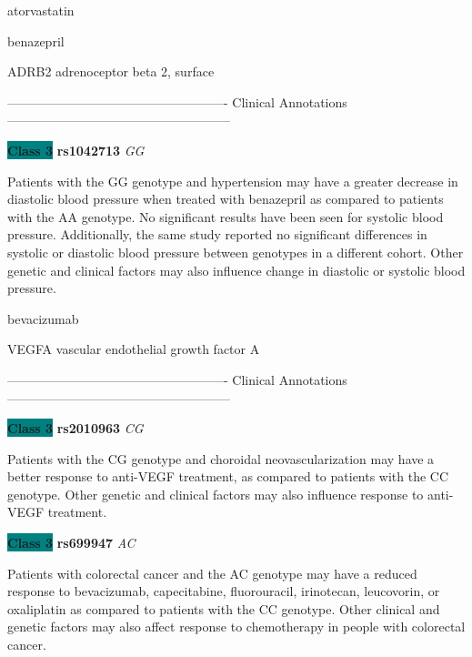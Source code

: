 \documentclass{resume} %
\begin{document}
\begin{rSection}{ atorvastatin }
\end{rSection}\begin{rSection}{ benazepril }
\item[]

\begin{rSubsection}{ ADRB2 }{ adrenoceptor beta 2, surface }{}{}
\item[]

\item[] ---------------------------------------------------- Clinical Annotations -----------------------------------------------------\newline
\item \textbf{\colorbox{teal} {Class 3}} \textbf{ rs1042713 } \textit{ GG }
\item[] Patients with the GG genotype and hypertension may have a greater decrease in diastolic blood pressure when treated with benazepril as compared to patients with the AA genotype. No significant results have been seen for systolic blood pressure. Additionally, the same study reported no significant differences in systolic or diastolic blood pressure between genotypes in a different cohort. Other genetic and clinical factors may also influence change in diastolic or systolic blood pressure.
\end{rSubsection}

\end{rSection}\begin{rSection}{ bevacizumab }
\item[]

\begin{rSubsection}{ VEGFA }{ vascular endothelial growth factor A }{}{}
\item[]

\item[] ---------------------------------------------------- Clinical Annotations -----------------------------------------------------\newline
\item \textbf{\colorbox{teal} {Class 3}} \textbf{ rs2010963 } \textit{ CG }
\item[] Patients with the CG genotype and choroidal neovascularization may have a better response to anti-VEGF treatment, as compared to patients with the CC genotype. Other genetic and clinical factors may also influence response to anti-VEGF treatment. \item \textbf{\colorbox{teal} {Class 3}} \textbf{ rs699947 } \textit{ AC }
\item[] Patients with colorectal cancer and the AC genotype may have a reduced response to bevacizumab, capecitabine, fluorouracil, irinotecan, leucovorin, or oxaliplatin as compared to patients with the CC genotype. Other clinical and genetic factors may also affect response to chemotherapy in people with colorectal cancer.
\end{rSubsection}


\end{rSection}
\end{document}
